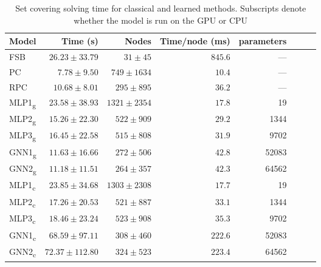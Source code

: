 \begin{scriptsize}
\begin{table}[ht]
	\centering
	\begin{tabular}{lrrrrrrr}
		\toprule
		Model & Time (s) & Nodes  & Time/node (ms) & parameters \\
		\midrule
		FSB & $26.23 \pm  33.79$ & $31 \pm 45$ & $845.6$ & ---\\
		PC  & $7.78 \pm 9.50$ & $749 \pm 1634$ & $10.4$ & ---\\
		RPC & $10.68 \pm 8.01$ & $295 \pm 895$ & $36.2$ & ---\\
		\addlinespace
		MLP1\textsubscript{g} & $23.58 \pm 38.93$ &  $1321 \pm 2354$ &  $  17.8$& 19\\
		MLP2\textsubscript{g} & $15.26 \pm 22.30 $ &  $ 522 \pm  909 $ &  $  29.2$ & 1344\\
		MLP3\textsubscript{g} & $16.45 \pm 22.58$ & $515 \pm 808 $  & $31.9$ & 9702\\
		GNN1\textsubscript{g} & $11.63 \pm 16.66$ & $272 \pm 506 $  & $42.8$ & 52083\\
		GNN2\textsubscript{g} & $\mathbf{11.18 \pm 11.51}$ & $264 \pm 357 $  & $42.3$ & 64562\\
		\addlinespace
		MLP1\textsubscript{c} & $23.85 \pm 34.68$ & $1303 \pm 2308$ & $17.7$ & 19\\
		MLP2\textsubscript{c} & $17.26 \pm 20.53$ & $521 \pm 887$   & $33.1$ & 1344\\
		MLP3\textsubscript{c} & $18.46 \pm 23.24$ & $523 \pm  908$  & $35.3$ & 9702\\
		GNN1\textsubscript{c} & $68.59 \pm 97.11$ & $308 \pm 460$   & $222.6$ & 52083\\
		GNN2\textsubscript{c} & $72.37 \pm 112.80$ & $324 \pm 523$  & $223.4$ & 64562\\
		\bottomrule
	\end{tabular}
	\caption{Set covering solving time for classical and learned methods. Subscripts denote whether the model is run on the \gls{GPU} or \gls{CPU}}\label{tab:results1_set}
\end{table}
\end{scriptsize}
